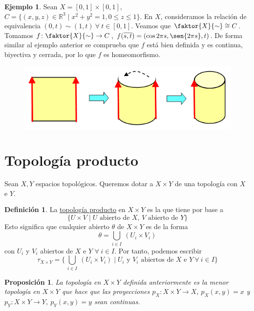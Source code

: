 \documentclass[12pt]{report}
\newtheorem{proposition}{Proposición}[chapter]
\theoremstyle{definition}
\newtheorem{definition}{Definición}[chapter]
\theoremstyle{definition}
\newtheorem{example}{Ejemplo}[chapter]
\theoremstyle{remark}
\newcommand{\R}{\mathbb R}
\begin{document}
\begin{example}
Sean $X = [0,1] \times [0,1]$, $C = \{(x,y,z) \in \R^3 \mid x^2 + y^2 = 1, 0 \leq z \leq 1\}$. En $X$, consideramos la relación de equivalencia $(0,t) \sim (1,t) \ \forall \  t \in [0,1]$. Veamos que $\faktor{X}{\sim} \cong C$. Tomamos $f \colon \faktor{X}{\sim} \to C$, $f(\overline{s,t}) = (\cos{2 \pi s}, \sen{2 \pi s}, t)$. De forma similar al ejemplo anterior se comprueba que $f$ está bien definida y es continua, biyectiva y cerrada, por lo que $f$ es homeomorfismo.

\begin{figure}[h]
\includegraphics[scale = 0.7]{ex1.27}
\centering
\end{figure}

\end{example}

\section{Topología producto}

Sean $X, Y$ espacios topológicos. Queremos dotar a $X \times Y$ de una topología  con $X$ e $Y$.

\begin{definition}
La \underline{topología producto} en $X \times Y$ es la que tiene por base a \[\{U \times V \mid U \textrm{ abierto de } X \textrm{, } V \textrm{ abierto de } Y\}\] Esto significa que cualquier abierto $\theta$ de $X \times Y$ es de la forma \[\theta = \bigcup_{i \in I} \ (U_i \times V_i)\] con $U_i$ y $V_i$ abiertos de $X$ e $Y$ $\forall \ i \in I$. Por tanto, podemos escribir
\[\tau_{X \times Y} = \biggl\{ \, \bigcup_{i \in I} \ (U_i \times V_i) \mid U_i \textrm{ y } V_i \textrm{ abiertos de } X \textrm{ e } Y \ \forall \ i \in I \biggr\}\]
\end{definition}

\begin{proposition}
La topología en $X \times Y$ definida anteriormente es la menor topología en $X \times Y$ que hace que las proyecciones $p_X \colon X \times Y \to X$, $p_X(x,y) = x$ y $p_Y \colon X \times Y \to Y$, $p_Y(x,y) = y$ sean continuas.
\end{proposition}
\end{document}
